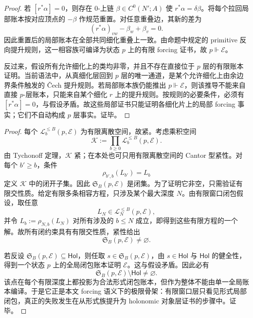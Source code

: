 \begin{proof}
若 \([r^\ast\alpha]=0\)，则存在 \(0\)-上链 \(\beta\in C^0(N';A)\) 使 \(r^\ast\alpha=\delta\beta\)。将每个拉回局部账本按对应顶点的 \(-\beta\) 作规范重置。对任意重叠边，其新的差为
\[
(r^\ast\alpha)_{vw}-\beta_w+\beta_v=0.
\]
因此重置后的局部账本在全部共同细化重叠上一致。由命题中规定的 primitive 反向提升规则，这一相容族可编译为状态 \(p\) 上的有限 forcing 证书，故 \(p\Vdash\mathcal E\)。

反过来，假设所有允许细化上的类均非零，并且不存在直接位于 \(p\) 层的有限账本证明。当前语法中，从真细化层回到 \(p\) 层的唯一通道，是某个允许细化上由余边界条件触发的 \v Cech 提升规则。若局部账本族仍能推出 \(p\Vdash\mathcal E\)，则该推导不能来自直接 \(p\)-层账本，只能来自某个细化 \(r\) 上的提升规则。按规则的必要条件，必须有 \([r^\ast\alpha]=0\)，与假设矛盾。故这些局部证书只能证明各细化片上的局部 forcing 事实；它们不自动构成 \(p\) 层事实。证毕。
\end{proof}

\begin{proof}
每个 \(\mathcal L_b^{\le B}(p,\mathcal E)\) 为有限离散空间，故紧。考虑乘积空间
\[
\mathcal K:=\prod_{b\ge0}\mathcal L_b^{\le B}(p,\mathcal E).
\]
由 Tychonoff 定理，\(\mathcal K\) 紧；在本处也可只用有限离散空间的 Cantor 型紧性。对每个 \(b'\ge b\)，条件
\[
\rho_{b',b}(L_{b'})=L_b
\]
定义 \(\mathcal K\) 中的闭开子集。因此 \(\mathfrak S_B(p,\mathcal E)\) 是闭集。为了证明它非空，只需验证有限交性质。给定有限多条相容方程，只涉及某个最大深度 \(N\)。由有限窗口闭包假设，取任意
\[
L_N\in\mathcal L_N^{\le B}(p,\mathcal E),
\]
并令 \(L_b:=\rho_{N,b}(L_N)\) 对所有涉及的 \(b\le N\) 成立，即得到这些有限方程的一个解。故所有闭约束具有有限交性质，紧性给出
\[
\mathfrak S_B(p,\mathcal E)\ne\varnothing.
\]

若反设 \(\mathfrak S_B(p,\mathcal E)\subseteq\mathsf{Hol}\)，则任取 \(s\in\mathfrak S_B(p,\mathcal E)\)，由 \(s\in\mathsf{Hol}\) 与 \(\mathsf{Hol}\) 的健全性，得到一个状态 \(p\) 上的全局闭包账本证明 \(\mathcal E\)。这与假设矛盾。因此必有
\[
\mathfrak S_B(p,\mathcal E)\setminus\mathsf{Hol}\ne\varnothing.
\]
该点在每个有限深度上都投影为合法形式闭包账本，但作为整体不能由单一全局账本编译。于是它正是本文 forcing 语义下的极限骨架：有限窗口层只看见形式局部闭包，真正的失败发生在从形式族提升为 holonomic 对象层证书的步骤中。证毕。
\end{proof}

